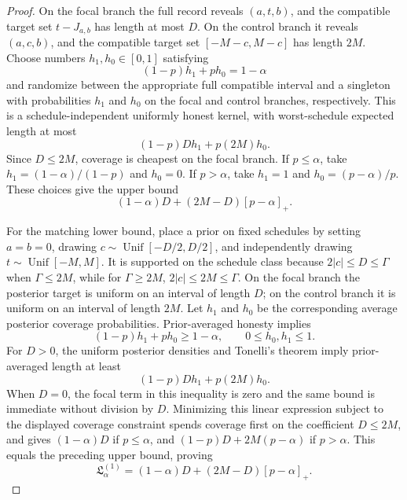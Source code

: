 \documentclass{article}
\begin{document}
\begin{proof}
On the focal branch the full record reveals \((a,t,b)\), and the compatible target set \(t-J_{a,b}\) has length at most \(D\).  On the control branch it reveals \((a,c,b)\), and the compatible target set \([-M-c,M-c]\) has length \(2M\).  Choose numbers \(h_1,h_0\in[0,1]\) satisfying
\[
 (1-p)h_1+ph_0=1-\alpha
\]
and randomize between the appropriate full compatible interval and a singleton with probabilities \(h_1\) and \(h_0\) on the focal and control branches, respectively.  This is a schedule-independent uniformly honest kernel, with worst-schedule expected length at most
\[
 (1-p)Dh_1+p(2M)h_0.
\]
Since \(D\le2M\), coverage is cheapest on the focal branch.  If \(p\le\alpha\), take \(h_1=(1-\alpha)/(1-p)\) and \(h_0=0\).  If \(p>\alpha\), take \(h_1=1\) and \(h_0=(p-\alpha)/p\).  These choices give the upper bound
\[
 (1-\alpha)D+(2M-D)[p-\alpha]_+.
\]

For the matching lower bound, place a prior on fixed schedules by setting \(a=b=0\), drawing \(c\sim\operatorname{Unif}[-D/2,D/2]\), and independently drawing \(t\sim\operatorname{Unif}[-M,M]\).  It is supported on the schedule class because \(2|c|\le D\le\Gamma\) when \(\Gamma\le2M\), while for \(\Gamma\ge2M\), \(2|c|\le2M\le\Gamma\).  On the focal branch the posterior target is uniform on an interval of length \(D\); on the control branch it is uniform on an interval of length \(2M\).  Let \(h_1\) and \(h_0\) be the corresponding average posterior coverage probabilities.  Prior-averaged honesty implies
\[
 (1-p)h_1+ph_0\ge1-\alpha,
 \qquad 0\le h_0,h_1\le1.
\]
For \(D>0\), the uniform posterior densities and Tonelli's theorem imply prior-averaged length at least
\[
 (1-p)Dh_1+p(2M)h_0.
\]
When \(D=0\), the focal term in this inequality is zero and the same bound is immediate without division by \(D\).
Minimizing this linear expression subject to the displayed coverage constraint spends coverage first on the coefficient \(D\le2M\), and gives \((1-\alpha)D\) if \(p\le\alpha\), and \((1-p)D+2M(p-\alpha)\) if \(p>\alpha\).  This equals the preceding upper bound, proving
\[
 \mathfrak L_\alpha^{(1)}
 =(1-\alpha)D+(2M-D)[p-\alpha]_+.
\]


\end{proof}
\end{document}
